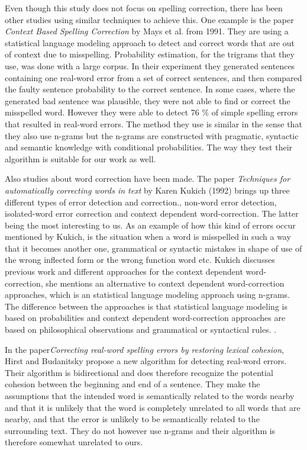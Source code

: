 \documentclass[a4paper,12pt]{article}
\begin{document}
Even though this study does not focus on spelling correction, there has been other studies using similar techniques to achieve this. One example is the paper \emph{Context Based Spelling Correction} by Mays et al. from 1991. They are using a statistical language modeling approach to detect and correct words that are out of context due to misspelling.  Probability estimation, for the trigrams that they use, was done with a large corpus. In their experiment they generated sentences containing one real-word error from a set of correct sentences, and then compared the faulty sentence probability to the correct sentence. In some cases, where the generated bad sentence was plausible, they were not able to find or correct the misspelled word. However they were able to detect 76 \% of simple spelling errors that resulted in real-word errors. The method they use is similar in the sense that they also use n-grams but the n-grams are constructed with pragmatic, syntactic and semantic knowledge with conditional probabilities. The way they test their algorithm is suitable for our work as well.\cite{mays}

Also studies about word correction have been made. The paper \emph{Techniques for automatically correcting words in text} by Karen Kukich (1992) brings up three different types of error detection and correction., non-word error detection, isolated-word error correction and context dependent word-correction. The latter being the most interesting to us. As an example of how this kind of errors occur mentioned by Kukich, is the situation when a word is misspelled in such a way that it becomes another one, grammatical or syntactic mistakes in shape of use of the wrong inflected form or the wrong function word etc. Kukich discusses previous work and different approaches for the context dependent word-correction, she mentions an alternative to context dependent word-correction approaches, which is an statistical language modeling approach using n-grams. The difference between the approaches is that statistical language modeling is based on probabilities and context dependent word-correction approaches are based on philosophical observations and grammatical or syntactical rules. \cite{Kukich1992Tecniques}.

In the paper\emph{Correcting real-word spelling errors by restoring lexical cohesion}, Hirst and Budanitsky propose a new algorithm for detecting real-word errors. Their algorithm is bidirectional and does therefore recognize the potential cohesion between the beginning and end of a sentence.  They make the assumptions that the intended word is semantically related to the words nearby and that it is unlikely that the word is completely unrelated to all words that are nearby, and that the error is unlikely to be semantically related to the surrounding text. They do not however use n-grams and their algorithm is therefore somewhat unrelated to ours. \cite{hirst}
\end{document}
